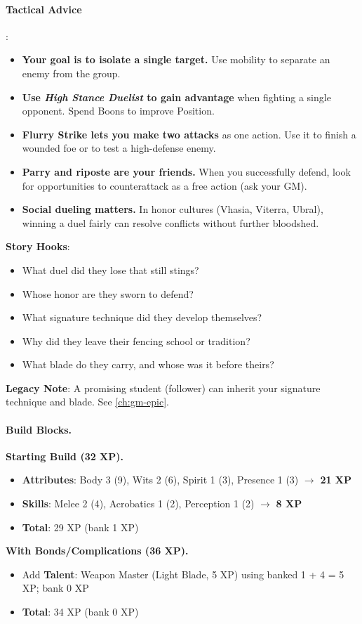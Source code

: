 \paragraph{Tactical Advice}:
\begin{itemize}
\item \textbf{Your goal is to isolate a single target.} Use mobility to separate an enemy from the group.
\item \textbf{Use \emph{High Stance Duelist} to gain advantage} when fighting a single opponent. Spend Boons to improve Position.
\item \textbf{Flurry Strike lets you make two attacks} as one action. Use it to finish a wounded foe or to test a high-defense enemy.
\item \textbf{Parry and riposte are your friends.} When you successfully defend, look for opportunities to counterattack as a free action (ask your GM).
\item \textbf{Social dueling matters.} In honor cultures (Vhasia, Viterra, Ubral), winning a duel fairly can resolve conflicts without further bloodshed.
\end{itemize}

\textbf{Story Hooks}:
\begin{itemize}
\item What duel did they lose that still stings?
\item Whose honor are they sworn to defend?
\item What signature technique did they develop themselves?
\item Why did they leave their fencing school or tradition?
\item What blade do they carry, and whose was it before theirs?
\end{itemize}

\textbf{Legacy Note}: A promising student (follower) can inherit your signature technique and blade. See \ref{ch:gm-epic}.

\paragraph{Build Blocks.}
\textbf{Starting Build (32 XP).}
\begin{itemize}
\item \textbf{Attributes}: Body 3 (9), Wits 2 (6), Spirit 1 (3), Presence 1 (3) \(\rightarrow\) \textbf{21 XP}
\item \textbf{Skills}: Melee 2 (4), Acrobatics 1 (2), Perception 1 (2) \(\rightarrow\) \textbf{8 XP}
\item \textbf{Total}: 29 XP (bank 1 XP)
\end{itemize}
\textbf{With Bonds/Complications (36 XP).}
\begin{itemize}
\item Add \textbf{Talent}: Weapon Master (Light Blade, 5 XP) using banked 1 + 4 = 5 XP; bank 0 XP
\item \textbf{Total}: 34 XP (bank 0 XP)
\end{itemize}


